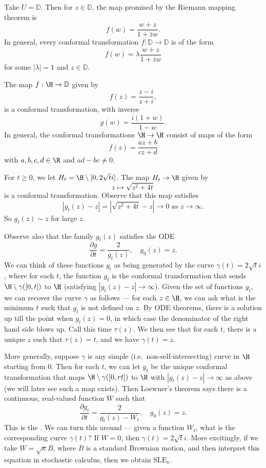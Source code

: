 \documentclass[a4paper]{article}
\renewcommand\D{\mathbb{D}}
\newcommand\SLE{\mathrm{SLE}}
\begin{document}
\begin{eg}
  Take $U = \D$. Then for $z \in \D$, the map promised by the Riemann mapping theorem is
  \[
    f(w) = \frac{w + z}{1 + \bar{z} w}.
  \]
  In general, every conformal transformation $f: \D \to \D$ is of the form
  \[
    f(w) = \lambda \frac{w + z}{1 + \bar{z}w}
  \]
  for some $|\lambda| = 1$ and $z \in \D$.
\end{eg}

\begin{eg}
  The map $f: \H \to \D$ given by
  \[
    f(z) = \frac{z - i}{z + i},
  \]
  is a conformal transformation, with inverse
  \[
    g(w) = \frac{i(1 + w)}{1 - w}.
  \]
  In general, the conformal transformations $\H \to \H$ consist of maps of the form
  \[
    f(z) = \frac{az + b}{c z + d}
  \]
  with $a, b, c, d \in \R$ and $ad - bc \not= 0$.
\end{eg}

\begin{eg}
  For $t \geq 0$, we let $H_t = \H \setminus [0, 2\sqrt{t} i]$. The map $H_t \to \H$ given by
  \[
    z \mapsto \sqrt{z^2 + 4t}
  \]
  is a conformal transformation. Observe that this map satisfies
  \[
    |g_t(z) - z| = |\sqrt{z^2 + 4t} - z| \to 0\text{ as } z \to \infty.
  \]
  So $g_t(z) \sim z$ for large $z$.

  Observe also that the family $g_t(z)$ satisfies the ODE
  \[
    \frac{\partial g}{\partial t} = \frac{2}{g_t(z)},\quad g_0(z) = z.
  \]
  We can think of these functions $g_t$ as being generated by the curve $\gamma(t) = 2 \sqrt{t}i$, where for each $t$, the function $g_t$ is the conformal transformation that sends $\H \setminus \gamma([0, t])$ to $\H$ (satisfying $|g_t(z) - z| \to \infty$). Given the set of functions $g_t$, we can recover the curve $\gamma$ as follows --- for each $z \in \H$, we can ask what is the minimum $t$ such that $g_t$ is not defined on $z$. By ODE theorems, there is a solution up till the point when $g_t(z) = 0$, in which case the denominator of the right hand side blows up. Call this time $\tau(z)$. We then see that for each $t$, there is a unique $z$ such that $\tau(z) = t$, and we have $\gamma(t) = z$.

  More generally, suppose $\gamma$ is any simple (i.e.\ non-self-intersecting) curve in $\H$ starting from $0$. Then for each $t$, we can let $g_t$ be the unique conformal transformation that maps $\H \setminus \gamma([0, rt])$ to $\H$ with $|g_t(z) - z| \to \infty$ as above (we will later see such a map exists). Then Loewner's theorem says there is a continuous, real-valued function $W$ such that
  \[
    \frac{\partial g_t}{\partial t} = \frac{2}{g_t(z) - W_t},\quad g_0(z) = z.
  \]
  This is the . We can turn this around --- given a function $W_t$, what is the corresponding curve $\gamma(t)$? If $W = 0$, then $\gamma(t) = 2\sqrt{t}i$. More excitingly, if we take $W = \sqrt{\kappa} B$, where $B$ is a standard Brownian motion, and then interpret this equation in stochastic calculus, then we obtain $\SLE_\kappa$.
\end{eg}
\end{document}
